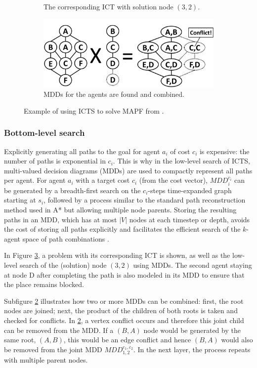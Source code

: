 \documentclass[english]{article}
\begin{document}
\begin{figure}[b]
\begin{subfigure}{0.3\textwidth}
			\caption{The corresponding ICT with solution node $(3,2)$.}
			\label{fig:ict2}
		\end{subfigure}
		\hfill
		\begin{subfigure}{0.4\textwidth}
			\centering
			\includegraphics[width=\linewidth]{img/mdds}
			\caption{MDDs for the agents are found and combined.}
			\label{fig:mdds}
		\end{subfigure}
		
		\caption{Example of using ICTS to solve MAPF from \cite{sharon2013}.}
		\label{fig:bottom}
	\end{figure}
	\subsubsection{Bottom-level search}
	Explicitly generating all paths to the goal for agent $a_i$ of cost $c_i$ is expensive: the number of paths is exponential in $c_i$. This is why in the low-level search of ICTS, multi-valued decision diagrams (MDDs) are used to compactly represent all paths per agent. For agent $a_i$ with a target cost $c_i$ (from the cost vector), $MDD_i^{c_i}$ can be generated by a breadth-first search on the $c_i$-steps time-expanded graph starting at $s_i$, followed by a process similar to the standard path reconstruction method used in A* but allowing multiple node parents. Storing the resulting paths in an MDD, which has at most $|V|$ nodes at each timestep or depth, avoids the cost of storing all paths explicitly and facilitates the efficient search of the $k$-agent space of path combinations \cite{sharon2013}.
	
	In Figure \ref{fig:bottom}, a problem with its corresponding ICT is shown, as well as the low-level search of the (solution) node $(3,2)$ using MDDs. The second agent staying at node D after completing the path is also modeled in its MDD to ensure that the place remains blocked.
	
	Subfigure \ref{fig:mdds} illustrates how two or more MDDs can be combined: first, the root nodes are joined; next, the product of the children of both roots is taken and checked for conflicts. In \ref{fig:mdds}, a vertex conflict occurs and therefore this joint child can be removed from the MDD. If a $(B,A)$ node would be generated by the same root, $(A,B)$, this would be an edge conflict and hence $(B,A)$ would also be removed from the joint MDD $MDD_{1,2}^{c_1,c_2}$. In the next layer, the process repeats with multiple parent nodes.
	
\end{document}
